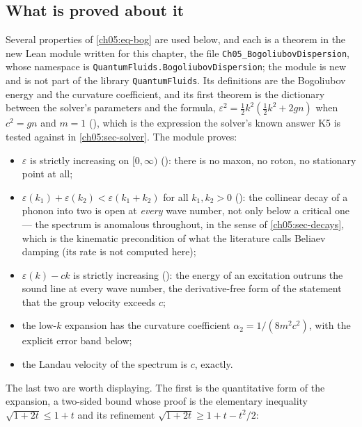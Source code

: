 \subsection{What is proved about it}
Several properties of \cref{ch05:eq-bog} are used below, and each is a theorem in the new Lean module written for this chapter, the file \texttt{Ch05\_\allowbreak BogoliubovDispersion}, whose namespace is \texttt{QuantumFluids.\allowbreak BogoliubovDispersion}; the module is new and is not part of the library \texttt{QuantumFluids}.
Its definitions are the Bogoliubov energy and the curvature coefficient, and its first theorem is the dictionary between the solver's parameters and the formula,
$\varepsilon^2=\tfrac12k^2(\tfrac12k^2+2gn)$ when $c^2=gn$ and $m=1$ (), which is the expression the solver's known answer K5 is tested against in \cref{ch05:sec-solver}.
The module proves:
\begin{itemize}
 \item $\varepsilon$ is strictly increasing on $[0,\infty)$ (): there is no maxon, no roton, no stationary point at all;
 \item $\varepsilon(k_1)+\varepsilon(k_2)<\varepsilon(k_1+k_2)$ for all $k_1,k_2>0$ (): the collinear decay of a phonon into two is open at \emph{every} wave number, not only below a critical one --- the spectrum is anomalous throughout, in the sense of \cref{ch05:sec-decays}, which is the kinematic precondition of what the literature calls Beliaev damping (its rate is not computed here);
 \item $\varepsilon(k)-ck$ is strictly increasing (): the energy of an excitation outruns the sound line at every wave number, the derivative-free form of the statement that the group velocity exceeds $c$;
 \item the low-$k$ expansion has the curvature coefficient $\alpha_2=1/(8m^2c^2)$, with the explicit error band below;
 \item the Landau velocity of the spectrum is $c$, exactly.
\end{itemize}
The last two are worth displaying.
The first is the quantitative form of the expansion, a two-sided bound whose proof is the elementary inequality $\sqrt{1+2t}\le1+t$ and its refinement $\sqrt{1+2t}\ge1+t-t^2/2$:

